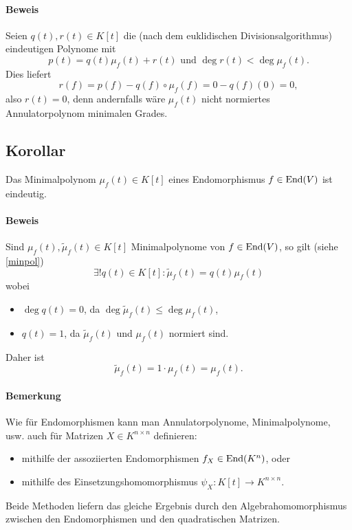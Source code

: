 \paragraph{Beweis}
	Seien $ q(t),r(t)\in K[t] $ die (nach dem euklidischen Divisionsalgorithmus) eindeutigen Polynome mit
		\[ p(t) = q(t)\mu_f(t)+r(t) \text{ und }\deg r(t)<\deg \mu_f(t). \]
	Dies liefert
		\[ r(f) = p(f)-q(f)\circ \mu_f(f) = 0-q(f)(0) = 0, \]
	also $ r(t) = 0 $, denn andernfalls wäre $ \mu_f(t) $ nicht normiertes Annulatorpolynom minimalen Grades.
	
\subsection{Korollar}
\begin{Korollar}
	Das Minimalpolynom $ \mu_f(t)\in K[t] $ eines Endomorphismus $ f\in \operatorname{End}(V) $ ist eindeutig.
\end{Korollar}
\paragraph{Beweis}
	Sind $ \mu_f(t),\tilde{\mu}_f(t)\in K[t] $ Minimalpolynome von $ f\in \operatorname{End}(V) $, so gilt (siehe \ref{minpol})
		\[ \exists! q(t)\in K[t] : \tilde{\mu}_f(t) = q(t)\mu_f(t) \] %
	wobei
		\begin{itemize}
			\item $ \deg q(t) = 0 $, da $ \deg \tilde{\mu}_f(t) \leq \deg \mu_f(t) $,
			\item $ q(t) = 1$, da $ \tilde{\mu}_f(t) $ und $ \mu_f(t) $ normiert sind.
		\end{itemize}
	Daher ist
		\[ \tilde{\mu}_f(t) = 1\cdot \mu_f(t) = \mu_f(t). \]
\paragraph{Bemerkung}
	Wie für Endomorphismen kann man Annulatorpolynome, Minimalpolynome, usw. auch für Matrizen $ X\in K^{n\times n} $ definieren:
		\begin{itemize}
			\item mithilfe der assoziierten Endomorphismen $ f_X\in \operatorname{End}(K^n) $, oder 
			\item mithilfe des Einsetzungshomomorphismus $ \psi_X: K[t] \to K^{n\times n}. $ %
		\end{itemize}
	Beide Methoden liefern das gleiche Ergebnis durch den Algebrahomomorphismus zwischen den Endomorphismen und den quadratischen Matrizen.

